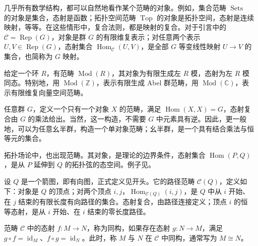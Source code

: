 \begin{example}\label{ex:4.2}
几乎所有数学结构，都可以自然地看作某个范畴的对象。例如，集合范畴 $\operatorname{Sets}$ 的对象是集合，态射是函数；拓扑空间范畴 $\operatorname{Top}$ 的对象是拓扑空间，态射是连续映射，等等。在这些情形中，复合法则，都是映射的复合。对于引言中的 $\mathcal{C}=\operatorname{Rep}(G)$，对象是群 $G$ 的有限维复表示；对任意两个表示 $U,V\in\operatorname{Rep}(G)$，态射集合 $\operatorname{Hom}_{\mathcal{C}}(U,V)$，是全部 $G$ 等变线性映射 $U\to V$ 的集合，也简称为 $G$ 映射。
\end{example}

\begin{example}\label{ex:4.3}
给定一个环 $R$，有范畴 $\operatorname{Mod}(R)$，其对象为有限生成左 $R$ 模，态射为左 $R$ 模同态。特别地，用 $\operatorname{Mod}(\mathbb{Z})$，表示有限生成 Abel 群范畴，用 $\operatorname{Mod}(\mathbb{C})$，表示有限维复向量空间范畴。
\end{example}

\begin{example}\label{ex:4.4}
任意群 $G$，定义一个只有一个对象 $X$ 的范畴，满足 $\operatorname{Hom}(X,X)=G$，态射复合由 $G$ 的乘法给出。当然，这一构造，不需要 $G$ 中元素具有逆。因此，更一般地，可以为任意幺半群，构造一个单对象范畴；幺半群，是一个具有结合乘法与恒等元的集合。
\end{example}

\begin{example}\label{ex:4.5}
拓扑场论中，也出现范畴。其对象，是理论的边界条件，态射集合 $\operatorname{Hom}(P,Q)$，是从 $P$ 延伸到 $Q$ 的拓扑弦的态空间。例子见。
\end{example}

\begin{example}\label{ex:4.6}
设 $Q$ 是一个箭图，即有向图，正式定义见开头。它的路径范畴 $\mathcal{C}(Q)$，定义如下：对象是 $Q$ 的顶点；对两个顶点 $i,j$，$\operatorname{Hom}_{\mathcal{C}(Q)}(i,j)$，是 $Q$ 中从 $i$ 开始、在 $j$ 结束的有限长度有向路径的集合。态射复合，由路径连接定义；顶点 $i$ 的恒等态射，是从 $i$ 开始、在 $i$ 结束的零长度路径。
\end{example}

\begin{definition*}\label{def:4.isomorphism}
范畴 $\mathcal{C}$ 中的态射 $f\colon M\to N$，称为同构，如果存在态射 $g\colon N\to M$，满足 $g\circ f=\operatorname{id}_M$、$f\circ g=\operatorname{id}_N$。此时，称 $M$ 与 $N$ 在 $\mathcal{C}$ 中同构，通常写为 $M\cong N$。
\end{definition*}

